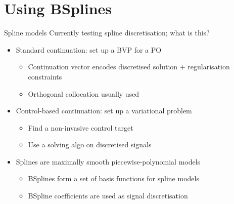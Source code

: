 \documentclass[presentation]{beamer}
\begin{document}
\section{Using BSplines}
\label{sec:org7ae0f07}
\begin{frame}[label={sec:org5aba726}]{Spline models}
Currently testing spline discretisation; what is this?
\vfill
\begin{itemize}
\item Standard continuation: set up a BVP for a PO
\begin{itemize}
\item Continuation vector encodes discretised solution + regularisation constraints
\item Orthogonal collocation usually used
\end{itemize}
\end{itemize}
\vfill
\begin{itemize}
\item Control-based continuation: set up a variational problem
\begin{itemize}
\item Find a non-invasive control target
\item Use a solving algo on discretised signals
\end{itemize}
\end{itemize}
\vfill
\begin{itemize}
\item Splines are maximally smooth piecewise-polynomial models
\begin{itemize}
\item BSplines form a set of basis functions for spline models
\item BSpline coefficients are used as signal discretisation
\end{itemize}
\end{itemize}
\end{frame}
\end{document}
